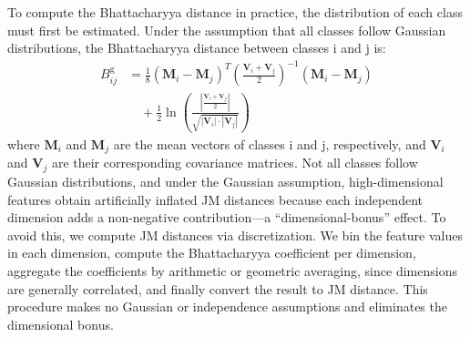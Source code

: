 To compute the Bhattacharyya distance in practice, the distribution of each class must first be estimated. Under the assumption that all classes follow Gaussian distributions, the Bhattacharyya distance between classes i and j is:
\begin{equation}
    \begin{aligned} B_{ij}^{\text{g}} &= \frac{1}{8} (\mathbf{M}_i - \mathbf{M}_j)^T \left( \frac{\mathbf{V}_i + \mathbf{V}_j}{2} \right)^{-1} (\mathbf{M}_i - \mathbf{M}_j) \\ &\quad + \frac{1}{2} \ln \left( \frac{ | \frac{\mathbf{V}_i + \mathbf{V}_j}{2} | }{ \sqrt{ | \mathbf{V}_i | \cdot | \mathbf{V}_j | } } \right) \end{aligned}
\end{equation}
where $\mathbf{M}_i$ and $\mathbf{M}_j$ are the mean vectors of classes i and j, respectively, and $\mathbf{V}_i$ and $\mathbf{V}_j$ are their corresponding covariance matrices.
Not all classes follow Gaussian distributions, and under the Gaussian assumption, high-dimensional features obtain artificially inflated JM distances because each independent dimension adds a non-negative contribution---a ``dimensional-bonus'' effect. To avoid this, we compute JM distances via discretization. We bin the feature values in each dimension, compute the Bhattacharyya coefficient per dimension, aggregate the coefficients by arithmetic or geometric averaging, since dimensions are generally correlated, and finally convert the result to JM distance. This procedure makes no Gaussian or independence assumptions and eliminates the dimensional bonus.
